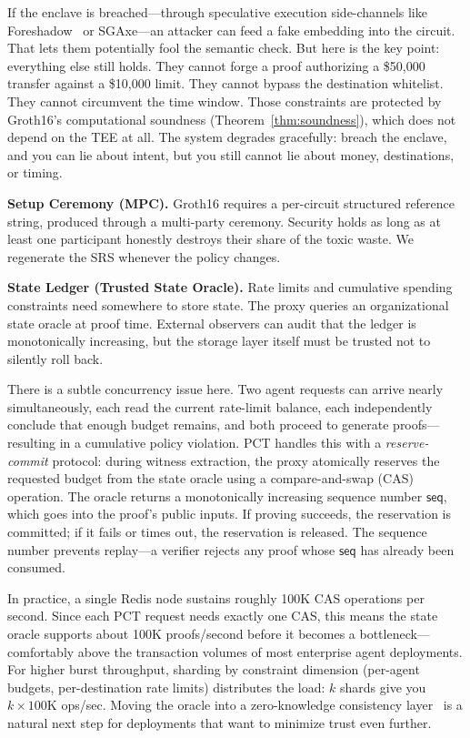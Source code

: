 \documentclass[10pt,conference]{IEEEtran}
\begin{document}
If the enclave is breached---through speculative execution side-channels like Foreshadow~\cite{costan2016intel} or SGAxe---an attacker can feed a fake embedding into the circuit. That lets them potentially fool the semantic check. But here is the key point: everything else still holds. They cannot forge a proof authorizing a \$50,000 transfer against a \$10,000 limit. They cannot bypass the destination whitelist. They cannot circumvent the time window. Those constraints are protected by Groth16's computational soundness (Theorem~\ref{thm:soundness}), which does not depend on the TEE at all. The system degrades gracefully: breach the enclave, and you can lie about intent, but you still cannot lie about money, destinations, or timing.

\textbf{Setup Ceremony (MPC).} Groth16 requires a per-circuit structured reference string, produced through a multi-party ceremony. Security holds as long as at least one participant honestly destroys their share of the toxic waste. We regenerate the SRS whenever the policy changes.

\textbf{State Ledger (Trusted State Oracle).} Rate limits and cumulative spending constraints need somewhere to store state. The proxy queries an organizational state oracle at proof time. External observers can audit that the ledger is monotonically increasing, but the storage layer itself must be trusted not to silently roll back.

There is a subtle concurrency issue here. Two agent requests can arrive nearly simultaneously, each read the current rate-limit balance, each independently conclude that enough budget remains, and both proceed to generate proofs---resulting in a cumulative policy violation. PCT handles this with a \emph{reserve-commit} protocol: during witness extraction, the proxy atomically reserves the requested budget from the state oracle using a compare-and-swap (CAS) operation. The oracle returns a monotonically increasing sequence number $\mathsf{seq}$, which goes into the proof's public inputs. If proving succeeds, the reservation is committed; if it fails or times out, the reservation is released. The sequence number prevents replay---a verifier rejects any proof whose $\mathsf{seq}$ has already been consumed.

In practice, a single Redis node sustains roughly 100K CAS operations per second. Since each PCT request needs exactly one CAS, this means the state oracle supports about 100K proofs/second before it becomes a bottleneck---comfortably above the transaction volumes of most enterprise agent deployments. For higher burst throughput, sharding by constraint dimension (per-agent budgets, per-destination rate limits) distributes the load: $k$ shards give you $k \times 100$K ops/sec. Moving the oracle into a zero-knowledge consistency layer~\cite{kothapalli2022nova} is a natural next step for deployments that want to minimize trust even further.
\end{document}
